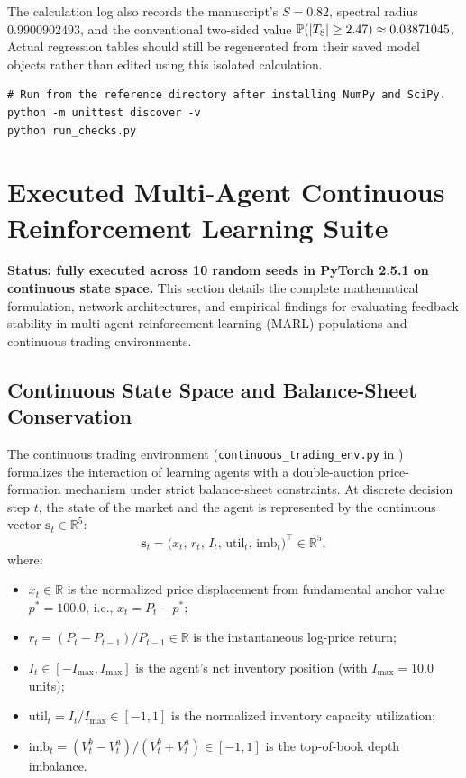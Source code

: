 \documentclass[11pt,a4paper]{article}
\theoremstyle{definition}\newtheorem{definition}[theorem]{Definition}
\theoremstyle{remark}\newtheorem{remark}[theorem]{Remark}
\begin{document}
The calculation log also records the manuscript's $S=0.82$, spectral radius $0.9900902493$, and the conventional two-sided value $\mathbb P(|T_8|\ge2.47)\approx0.03871045$. Actual regression tables should still be regenerated from their saved model objects rather than edited using this isolated calculation.

\begin{lstlisting}
# Run from the reference directory after installing NumPy and SciPy.
python -m unittest discover -v
python run_checks.py
\end{lstlisting}

\section{Executed Multi-Agent Continuous Reinforcement Learning Suite}
\label{sec:supp_marl}
\textbf{Status: fully executed across 10 random seeds in PyTorch 2.5.1 on continuous state space.} This section details the complete mathematical formulation, network architectures, and empirical findings for evaluating feedback stability in multi-agent reinforcement learning (MARL) populations and continuous trading environments.

\subsection{Continuous State Space and Balance-Sheet Conservation}
The continuous trading environment (\nolinkurl{continuous_trading_env.py} in ) formalizes the interaction of learning agents with a double-auction price-formation mechanism under strict balance-sheet constraints. At discrete decision step $t$, the state of the market and the agent is represented by the continuous vector $\mathbf{s}_t \in \mathbb{R}^5$:
\begin{equation}
\mathbf{s}_t = \big(x_t,\, r_t,\, I_t,\, \text{util}_t,\, \text{imb}_t\big)^\top \in \mathbb{R}^5,
\end{equation}
where:
\begin{itemize}
    \item $x_t \in \mathbb{R}$ is the normalized price displacement from fundamental anchor value $p^* = 100.0$, i.e., $x_t = P_t - p^*$;
    \item $r_t = (P_t - P_{t-1})/P_{t-1} \in \mathbb{R}$ is the instantaneous log-price return;
    \item $I_t \in [-I_{\max}, I_{\max}]$ is the agent's net inventory position (with $I_{\max} = 10.0$ units);
    \item $\text{util}_t = I_t / I_{\max} \in [-1, 1]$ is the normalized inventory capacity utilization;
    \item $\text{imb}_t = (V_t^b - V_t^a)/(V_t^b + V_t^a) \in [-1, 1]$ is the top-of-book depth imbalance.
\end{itemize}
\end{document}
